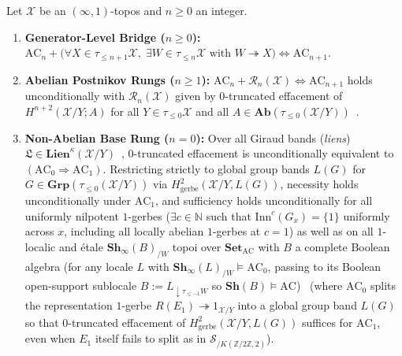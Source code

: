 \begin{theorem}\label{thm:postnikov-stepwise-proved}%
%
Let $\mathcal{X}$ be an $(\infty, 1)$-topos and $n \ge 0$ an integer.
\begin{enumerate}
  \item \textbf{Generator-Level Bridge ($n \ge 0$):} $\mathrm{AC}_n + \bigl(\forall X \in \tau_{\le n+1}\mathcal{X},\; \exists W \in \tau_{\le n}\mathcal{X}\text{ with } W \twoheadrightarrow X\bigr) \iff \mathrm{AC}_{n+1}$.
  \item \textbf{Abelian Postnikov Rungs ($n \ge 1$):} $\mathrm{AC}_n + \mathcal{R}_n(\mathcal{X}) \iff \mathrm{AC}_{n+1}$ holds unconditionally with $\mathcal{R}_n(\mathcal{X})$ given by $0$-truncated effacement of $H^{n+2}(\mathcal{X}/Y; A)$ for all $Y \in \tau_{\le 0}\mathcal{X}$ and all $A \in \mathbf{Ab}(\tau_{\le 0}(\mathcal{X}/Y))$~\cite[Constr.~7.2.2.21, Thm.~7.2.2.26]{Lurie09}.
  \item \textbf{Non-Abelian Base Rung ($n = 0$):} Over all Giraud bands (\emph{liens}) $\mathfrak{L} \in \mathbf{Lien}^\kappa(\mathcal{X}/Y)$~\cite[Ch.~IV]{Giraud71}, $0$-truncated effacement is unconditionally equivalent to $(\mathrm{AC}_0 \Rightarrow \mathrm{AC}_1)$. Restricting strictly to global group bands $L(G)$ for $G \in \mathbf{Grp}(\tau_{\le 0}(\mathcal{X}/Y))$ via $H^2_{\mathrm{gerbe}}(\mathcal{X}/Y, L(G))$, necessity holds unconditionally under $\mathrm{AC}_1$, and sufficiency holds unconditionally for all uniformly nilpotent $1$-gerbes ($\exists c \in \mathbb{N}$ such that $\mathrm{Inn}^c(G_x) = \{1\}$ uniformly across $x$, including all locally abelian $1$-gerbes at $c = 1$) as well as on all $1$-localic and \'etale $\mathbf{Sh}_\infty(B)_{/W}$ topoi over $\mathbf{Set}_{\mathrm{AC}}$ with $B$ a complete Boolean algebra (for any locale $L$ with $\mathbf{Sh}_\infty(L)_{/W} \models \mathrm{AC}_0$, passing to its Boolean open-support sublocale $B := L_{{\downarrow}\tau_{\le -1}W}$ so $\mathbf{Sh}(B) \models \mathrm{AC}$)~\cite[Prop.~6.4.5.7]{Lurie09} (where $\mathrm{AC}_0$ splits the representation $1$-gerbe $R(E_1) \twoheadrightarrow 1_{\mathcal{X}/Y}$ into a global group band $L(G)$ so that $0$-truncated effacement of $H^2_{\mathrm{gerbe}}(\mathcal{X}/Y, L(G))$ suffices for $\mathrm{AC}_1$, even when $E_1$ itself fails to split as in $\mathcal{S}_{/K(\mathbb{Z}/2\mathbb{Z}, 2)}$).
\end{enumerate}
\end{theorem}

